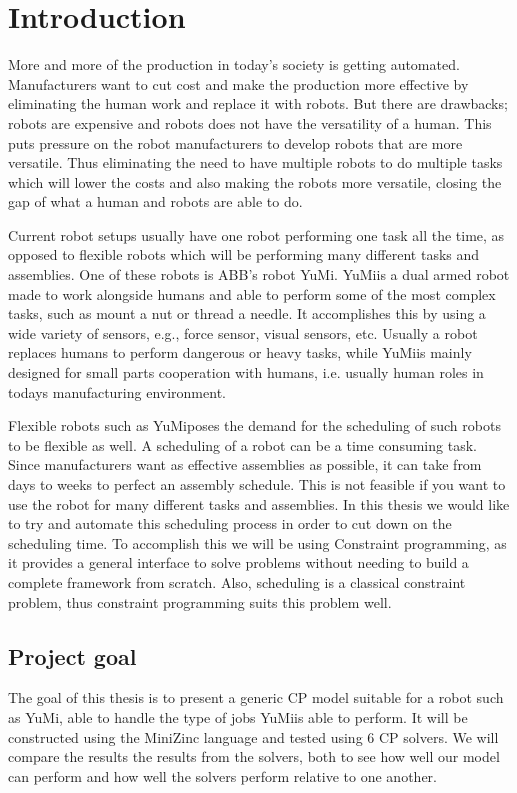 \chapter{Introduction} 

More and more of the production in today's society is getting automated. Manufacturers want to cut cost and make the production more effective by eliminating the human work and replace it with robots. But there are drawbacks; robots are expensive and robots does not have the versatility of a human. This puts pressure on the robot manufacturers to develop robots that are more versatile. Thus eliminating the need to have multiple robots to do multiple tasks which will lower the costs and also making the robots more versatile, closing the gap of what a human and robots are able to do.

Current robot setups usually have one robot performing one task all the time, as opposed to flexible robots which will be performing many different tasks and assemblies. One of these robots is ABB's robot YuMi\textsuperscript\textregistered. YuMi\textsuperscript\textregistered is a dual armed robot made to work alongside humans and able to perform some of the most complex tasks, such as mount a nut or thread a needle\cite{_yumi_}. It accomplishes this by using a wide variety of sensors, e.g., force sensor, visual sensors, etc. Usually a robot replaces humans to perform dangerous or heavy tasks, while YuMi\textsuperscript\textregistered is mainly designed for small parts cooperation with humans, i.e. usually human roles in todays manufacturing environment.

Flexible robots such as YuMi\textsuperscript\textregistered poses the demand for the scheduling of such robots to be flexible as well. A scheduling of a robot can be a time consuming task. Since manufacturers want as effective assemblies as possible, it can take from days to weeks to perfect an assembly schedule. This is not feasible if you want to use the robot for many different tasks and assemblies. In this thesis we would like to try and automate this scheduling process in order to cut down on the scheduling time. To accomplish this we will be using Constraint programming, as it provides a general interface to solve problems without needing to build a complete framework from scratch. Also, scheduling is a classical constraint problem, thus constraint programming suits this problem well.





\section{Project goal}
The goal of this thesis is to present a generic CP model suitable for a robot such as YuMi\textsuperscript\textregistered, able to handle the type of jobs YuMi\textsuperscript\textregistered is able to perform. It will be constructed using the MiniZinc language and tested using 6 CP solvers. We will compare the results the results from the solvers, both to see how well our model can perform and how well the solvers perform relative to one another.

